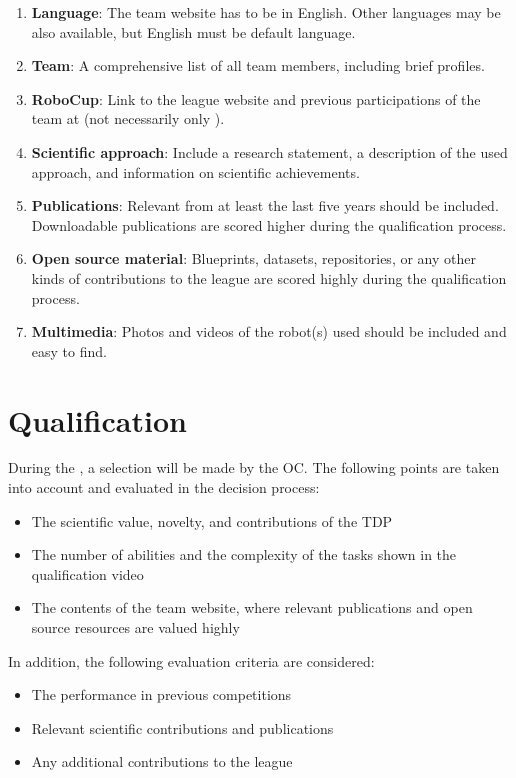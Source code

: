 \begin{enumerate}
	\item \textbf{Language}: The team website has to be in English. Other languages may be also available, but English must be default language.
	\item \textbf{Team}: A comprehensive list of all team members, including brief profiles.
	\item \textbf{RoboCup}: Link to the league website and previous participations of the team at \RoboCup{} (not necessarily only \AtHome).
	\item \textbf{Scientific approach}: Include a research statement, a description of the used approach, and information on scientific achievements.
	\item \textbf{Publications}: Relevant  from at least the last five years should be included. Downloadable publications are scored higher during the qualification process.
	\item \textbf{Open source material}: Blueprints, datasets, repositories, or any other kinds of contributions to the league are scored highly during the qualification process.
	\item \textbf{Multimedia}: Photos and videos of the robot(s) used should be included and easy to find.
\end{enumerate}

\section{Qualification}
\label{rule:qualification}

During the , a selection will be made by the OC.
The following points are taken into account and evaluated in the decision process:
\begin{itemize}
	\item The scientific value, novelty, and contributions of the TDP
	\item The number of abilities and the complexity of the tasks shown in the qualification video
	\item The contents of the team website, where relevant publications and open source resources are valued highly
\end{itemize}
In addition, the following evaluation criteria are considered:
\begin{itemize}
	\item The performance in previous competitions
	\item Relevant scientific contributions and publications
	\item Any additional contributions to the \AtHome{} league
\end{itemize}

